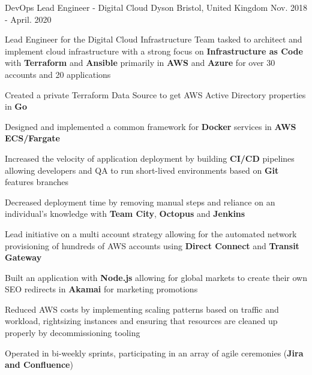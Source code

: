 \begin{cventries}
  \cventry
    {DevOps Lead Engineer - Digital Cloud} %
    {Dyson} %
    {Bristol, United Kingdom} %
    {Nov. 2018 - April. 2020} %
    {
      \begin{cvitems} %
        \item {Lead Engineer for the Digital Cloud Infrastructure Team tasked to architect and implement cloud infrastructure with a strong focus on \textbf{Infrastructure as Code} with \textbf{Terraform} and \textbf{Ansible} primarily in \textbf{AWS} and \textbf{Azure} for over 30 accounts and 20 applications}
        \item {Created a private Terraform Data Source to get AWS Active Directory properties in \textbf{Go}}
        \item {Designed and implemented a common framework for \textbf{Docker} services in \textbf{AWS ECS/Fargate}}
        \item {Increased the velocity of application deployment by building \textbf{CI/CD} pipelines allowing developers and QA to run short-lived environments based on \textbf{Git} features branches}
        \item {Decreased deployment time by removing manual steps and reliance on an individual’s knowledge with \textbf{Team City}, \textbf{Octopus} and \textbf{Jenkins}}
        \item {Lead initiative on a multi account strategy allowing for the automated network provisioning of hundreds of AWS accounts using \textbf{Direct Connect} and \textbf{Transit Gateway}}
        \item {Built an application with \textbf{Node.js} allowing for global markets to create their own SEO redirects in \textbf{Akamai} for marketing promotions}
        \item {Reduced AWS costs by implementing scaling patterns based on traffic and workload, rightsizing instances and ensuring that resources are cleaned up properly by decommissioning tooling}
        \item {Operated in bi-weekly sprints, participating in an array of agile ceremonies (\textbf{Jira and Confluence})}
      \end{cvitems}
    }


\end{cventries}

